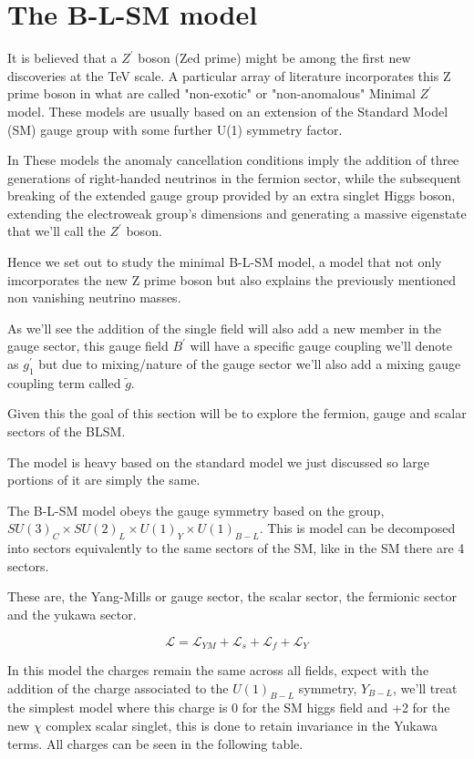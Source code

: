 \documentclass[11pt,twoside,a4paper]{article}
\begin{document}
\section{The B-L-SM model}

It is believed that a $Z^\prime$ boson (Zed prime) might be among the first new discoveries at the TeV scale. A particular array of literature incorporates this Z prime boson in what are called "non-exotic" or "non-anomalous" Minimal $Z^\prime$ model. These models are usually based on an extension of the Standard Model (SM) gauge group with some further U(1) symmetry factor. 

In These models the anomaly cancellation conditions imply the addition of three generations of right-handed neutrinos in the fermion sector, while the subsequent breaking of the extended gauge group provided by an extra singlet Higgs boson, extending the electroweak group's dimensions and generating a massive eigenstate that we'll call the  $Z^\prime$ boson. 

Hence we set out to study the minimal B-L-SM model, a model that not only imcorporates the new Z prime boson but also explains the previously mentioned non vanishing neutrino masses.

As we'll see the addition of the single field will also add a new member in the gauge sector, this gauge field $B^\prime$ will have a specific gauge coupling we'll denote as $g_1^\prime$ but due to mixing/nature of the gauge sector we'll also add a mixing gauge coupling term called $\tilde{g}$. 

Given this the goal of this section will be to explore the fermion, gauge and scalar sectors of the BLSM.   

The model is heavy based on the standard model we just discussed so large portions of it are simply the same.

The B-L-SM model obeys  the gauge symmetry based on the group, $ SU(3)_C  \times SU(2)_L \times U(1)_Y \times U(1)_{B-L}$.  This is model can be decomposed into sectors equivalently to the same sectors of the SM, like in the SM there are 4 sectors. 

These are, the Yang-Mills or gauge sector, the scalar sector, the fermionic sector and the yukawa sector. 

\begin{equation}
\mathcal{L}=\mathcal{L}_{YM}+\mathcal{L}_s+\mathcal{L}_f+\mathcal{L}_Y
\end{equation}

In this model the charges remain the same across all fields, expect with the addition of the charge associated to the $U(1)_{B-L}$ symmetry, $Y_{B-L}$, we'll treat the simplest model where this charge is 0 for the SM higgs field and +2 for the new $\chi$ complex scalar singlet, this is done to retain invariance in the Yukawa terms. All charges can be seen in the following table.  
\end{document}
